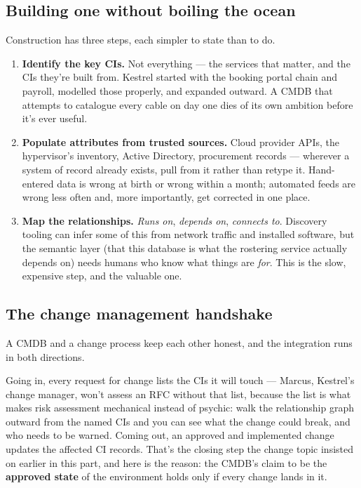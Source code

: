 \subsection{Building one without boiling the ocean}


Construction has three steps, each simpler to state than to do.


\begin{enumerate}[leftmargin=*]
\item \textbf{Identify the key CIs.} Not everything — the services that matter, and the CIs they're built from. Kestrel started with the booking portal chain and payroll, modelled those properly, and expanded outward. A CMDB that attempts to catalogue every cable on day one dies of its own ambition before it's ever useful.
\item \textbf{Populate attributes from trusted sources.} Cloud provider APIs, the hypervisor's inventory, Active Directory, procurement records — wherever a system of record already exists, pull from it rather than retype it. Hand-entered data is wrong at birth or wrong within a month; automated feeds are wrong less often and, more importantly, get corrected in one place.
\item \textbf{Map the relationships.} \emph{Runs on}, \emph{depends on}, \emph{connects to}. Discovery tooling can infer some of this from network traffic and installed software, but the semantic layer (that this database is what the rostering service actually depends on) needs humans who know what things are \emph{for}. This is the slow, expensive step, and the valuable one.
\end{enumerate}


\subsection{The change management handshake}


A CMDB and a change process keep each other honest, and the integration runs in both directions.


Going in, every request for change lists the CIs it will touch — Marcus, Kestrel's change manager, won't assess an RFC without that list, because the list is what makes risk assessment mechanical instead of psychic: walk the relationship graph outward from the named CIs and you can see what the change could break, and who needs to be warned. Coming out, an approved and implemented change updates the affected CI records. That's the closing step the change topic insisted on earlier in this part, and here is the reason: the CMDB's claim to be the \textbf{approved state} of the environment holds only if every change lands in it.


